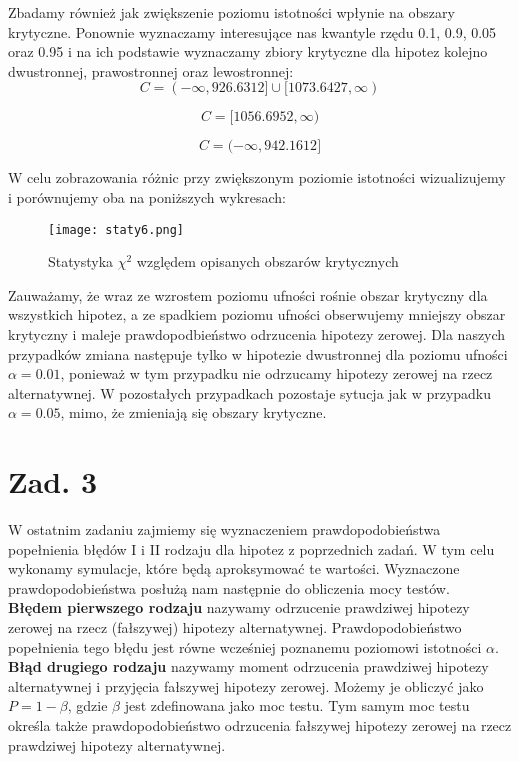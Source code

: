 \documentclass[12pt,letterpaper]{article}
\theoremstyle{definition}
\begin{document}
{{Zbadamy również jak zwiększenie poziomu istotności wpłynie na obszary krytyczne. Ponownie wyznaczamy interesujące nas kwantyle rzędu 0.1, 0.9, 0.05 oraz 0.95 i na ich podstawie wyznaczamy zbiory krytyczne dla hipotez kolejno dwustronnej, prawostronnej oraz lewostronnej:
\[
C = (-\infty, 926.6312]  \cup [1073.6427, \infty)
\]

\[
C = [1056.6952, \infty)
\]

\[
C = (-\infty, 942.1612]
\]

W celu zobrazowania różnic przy zwiększonym poziomie istotności wizualizujemy i porównujemy oba na poniższych wykresach:
\begin{figure}[H]
			\centering

				\centering
				\texttt{[image: staty6.png]}
				\caption{Statystyka $\chi^2$ względem opisanych obszarów krytycznych}
				\label{fig:zdjecie1}
			\hfill
		\end{figure}

Zauważamy, że wraz ze wzrostem poziomu ufności rośnie obszar krytyczny dla wszystkich hipotez, a ze spadkiem poziomu ufności obserwujemy mniejszy obszar krytyczny i maleje prawdopodbieństwo odrzucenia hipotezy zerowej. Dla naszych przypadków zmiana następuje tylko w hipotezie dwustronnej dla poziomu ufności $\alpha = 0.01$, ponieważ w tym przypadku nie odrzucamy hipotezy zerowej na rzecz alternatywnej. W pozostałych przypadkach pozostaje sytucja jak w przypadku $\alpha = 0.05$, mimo, że zmieniają się obszary krytyczne.

\section{Zad. 3}
W ostatnim zadaniu zajmiemy się wyznaczeniem prawdopodobieństwa popełnienia błędów I i II rodzaju dla hipotez z poprzednich zadań. W tym celu wykonamy symulacje, które będą aproksymować te wartości. Wyznaczone prawdopodobieństwa posłużą nam następnie do obliczenia mocy testów.\\

\textbf{Błędem pierwszego rodzaju} nazywamy odrzucenie prawdziwej hipotezy zerowej na rzecz (fałszywej) hipotezy alternatywnej. Prawdopodobieństwo popełnienia tego błędu jest równe wcześniej poznanemu poziomowi istotności $\alpha$.\\

\textbf{Błąd drugiego rodzaju} nazywamy moment odrzucenia prawdziwej hipotezy alternatywnej i przyjęcia fałszywej hipotezy zerowej. Możemy je obliczyć jako $P = 1 - \beta$, gdzie $\beta$ jest zdefinowana jako moc testu. Tym samym moc testu określa także prawdopodobieństwo odrzucenia fałszywej hipotezy zerowej na rzecz prawdziwej hipotezy alternatywnej.\\

}}
\end{document}
